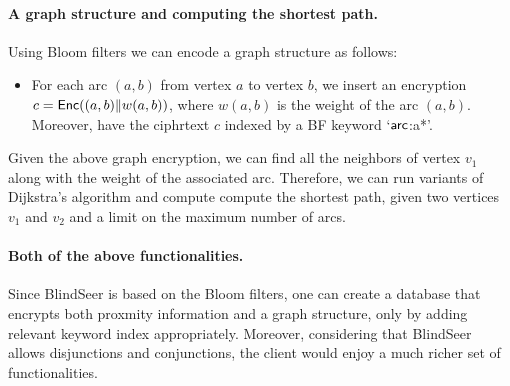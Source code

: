 \paragraph{A graph structure and computing the shortest path.}
Using Bloom filters we can encode a graph structure as follows:
\begin{itemize}
\item For each arc $(a, b)$ from vertex $a$ to vertex $b$, we insert an
  encryption $c = \mathsf{Enc}((a,b) \| w(a,b) )$, where $w(a,b)$ is the weight of the arc
    $(a,b)$. Moreover, have the ciphrtext $c$ indexed by a BF keyword `$\sf arc$:a*'. 
\end{itemize}

Given the above graph encryption, we can find all the neighbors of vertex $v_1$
along with the weight of the associated arc. Therefore, we can run variants of
Dijkstra's algorithm and compute compute the shortest path, given two vertices
$v_1$ and $v_2$ and a limit on the maximum number of arcs. 

\paragraph{Both of the above functionalities.}
Since BlindSeer is based on the Bloom filters, one can create a database that
encrypts both proxmity information and a graph structure, only by adding
relevant keyword index appropriately.
%
Moreover, considering that BlindSeer allows disjunctions and conjunctions, the
client would enjoy a much richer set of functionalities.  
